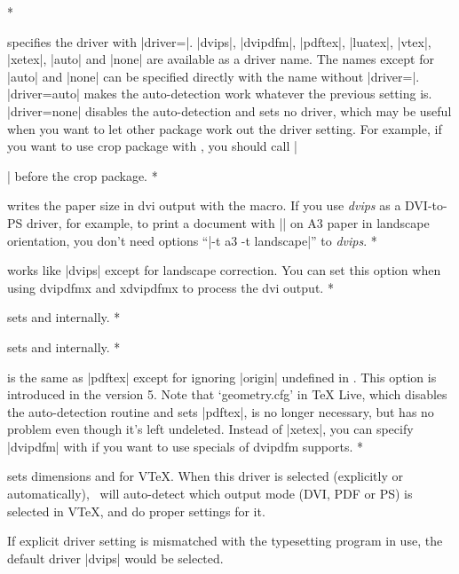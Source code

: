 \begin{Options}
\switchcolumn
\switchcolumn[0]*\item[\onlypre driver] specifies the driver with |driver=|. 
|dvips|, |dvipdfm|, |pdftex|, |luatex|, |vtex|, |xetex|, |auto| and |none| are
available as a driver name. The names except for |auto| and |none| can
be specified directly with the name without |driver=|.
|driver=auto| makes the auto-detection work whatever the previous setting is. 
|driver=none| disables the auto-detection and sets no driver, which
may be useful when you want to let other package work out the driver
setting. For example, if you want to use \textsf{crop} package with \Gm,
you should call |\usepackage[driver=none]{geometry}| before
the \textsf{crop} package.
\switchcolumn
\switchcolumn[0]*\item[\onlypre dvips] writes the paper size in dvi output with the 
    macro. If you use \textsl{dvips} as a DVI-to-PS driver,
    for example, to print a document with |\geometry{a3paper,landscape}|
    on A3 paper in landscape orientation, you don't need options
    ``|-t a3 -t landscape|'' to \textsl{dvips}. 
\switchcolumn
\switchcolumn[0]*\item[\onlypre dvipdfm] works like |dvips| except for landscape correction.
     You can set this option when using \textsf{dvipdfmx} and
     \textsf{xdvipdfmx} to process the dvi output.
\switchcolumn
\switchcolumn[0]*\item[\onlypre pdftex] sets  and 
     internally.
\switchcolumn
\switchcolumn[0]*\item[\onlypre luatex] sets  and  internally.
\switchcolumn
\switchcolumn[0]*\item[\onlypre xetex] is the same as |pdftex| except for ignoring
    |origin| undefined in \XeLaTeX{}. This option is introduced in
    the version 5. Note that `geometry.cfg' in \TeX{} Live, which disables the
    auto-detection routine and sets |pdftex|, is no longer necessary,
    but has no problem even though it's left undeleted.
    Instead of |xetex|, you can specify |dvipdfm| with \XeLaTeX{}
    if you want to use specials of dvipdfm \XeTeX{} supports.
\switchcolumn
\switchcolumn[0]*\item[\onlypre vtex] sets dimensions  and 
    for V\TeX. When this driver is selected (explicitly or
    automatically), \Gm\ will auto-detect which output mode
    (DVI, PDF or PS) is selected in V\TeX, and do proper
    settings for it.
\end{Options}
If explicit driver setting is mismatched with the typesetting program
in use, the default driver |dvips| would be selected.

